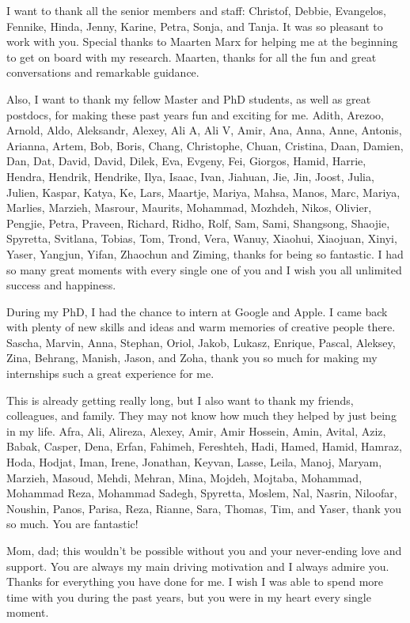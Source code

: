 I want to thank all the senior members and staff: Christof, Debbie, Evangelos, Fennike, Hinda, Jenny, Karine, Petra, Sonja, and Tanja. It was so pleasant to work with you.
Special thanks to Maarten Marx for helping me at the beginning to get on board with my research. Maarten, thanks for all the fun and great conversations and remarkable guidance.

Also, I want to thank my fellow Master and PhD students, as well as great postdocs, for making these past years fun and exciting for me. Adith, Arezoo, Arnold, Aldo, Aleksandr, Alexey, Ali A, Ali V, Amir, Ana, Anna, Anne, Antonis, Arianna, Artem, Bob, Boris, Chang, Christophe, Chuan, Cristina, Daan, Damien, Dan, Dat, David, David, Dilek, Eva, Evgeny, Fei, Giorgos, Hamid, Harrie, Hendra, Hendrik, Hendrike, Ilya, Isaac, Ivan, Jiahuan, Jie, Jin, Joost, Julia, Julien, Kaspar, Katya, Ke, Lars, Maartje, Mariya, Mahsa, Manos, Marc, Mariya, Marlies, Marzieh, Masrour, Maurits, Mohammad, Mozhdeh, Nikos, Olivier, Pengjie, Petra, Praveen, Richard, Ridho, Rolf, Sam, Sami, Shangsong, Shaojie, Spyretta, Svitlana, Tobias, Tom, Trond, Vera, Wanuy, Xiaohui, Xiaojuan, Xinyi, Yaser, Yangjun, Yifan, Zhaochun and Ziming, thanks for being so fantastic.  I had so many great moments with every single one of you and I wish you all unlimited success and happiness.


During my PhD, I had the chance to intern at Google and Apple. I came back with plenty of new skills and ideas and warm memories of creative people there. Sascha, Marvin, Anna, Stephan, Oriol, Jakob, Lukasz, Enrique, Pascal, Aleksey, Zina, Behrang, Manish, Jason, and Zoha, thank you so much for making my internships such a great experience for me. 

This is already getting really long, but I also want to thank my friends, colleagues, and family. They may not know how much they helped by just being in my life. Afra, Ali, Alireza, Alexey, Amir, Amir Hossein, Amin, Avital, Aziz, Babak, Casper, Dena, Erfan, Fahimeh, Fereshteh, Hadi, Hamed, Hamid, Hamraz, Hoda, Hodjat, Iman, Irene, Jonathan, Keyvan, Lasse, Leila, Manoj, Maryam, Marzieh, Masoud, Mehdi, Mehran, Mina, Mojdeh, Mojtaba, Mohammad, Mohammad Reza, Mohammad Sadegh, Spyretta, Moslem, Nal, Nasrin, Niloofar, Noushin, Panos, Parisa, Reza, Rianne, Sara, Thomas, Tim, and Yaser, thank you so much. You are fantastic!

Mom, dad; this wouldn't be possible without you and your never-ending love and support. You are always my main driving motivation and I always admire you. Thanks for everything you have done for me. I wish I was able to spend more time with you during the past years, but you were in my heart every single moment.

